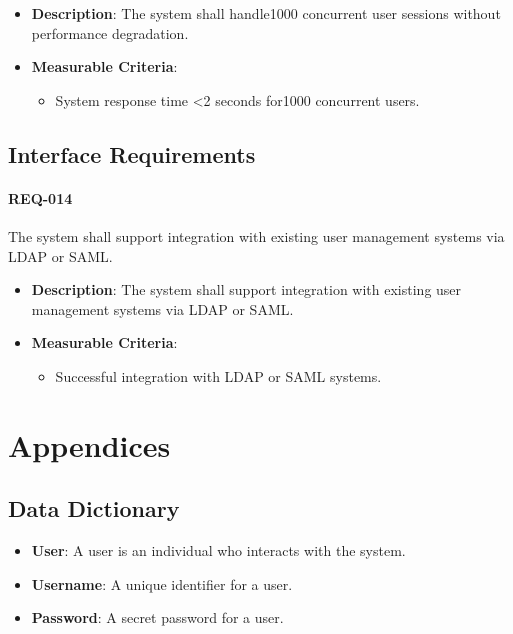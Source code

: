 \documentclass{article}
\begin{document}
\begin{itemize}
 \item \textbf{Description}: The system shall handle1000 concurrent user sessions without performance degradation.
 \item \textbf{Measurable Criteria}:
 \begin{itemize}
 \item System response time <2 seconds for1000 concurrent users.
 \end{itemize}
\end{itemize}

\subsection{Interface Requirements}

\paragraph{REQ-014}
The system shall support integration with existing user management systems via LDAP or SAML.

\begin{itemize}
 \item \textbf{Description}: The system shall support integration with existing user management systems via LDAP or SAML.
 \item \textbf{Measurable Criteria}:
 \begin{itemize}
 \item Successful integration with LDAP or SAML systems.
 \end{itemize}
\end{itemize}

\section{Appendices}
\label{sec:appendices}

\subsection{Data Dictionary}

\begin{itemize}
 \item \textbf{User}: A user is an individual who interacts with the system.
 \item \textbf{Username}: A unique identifier for a user.
 \item \textbf{Password}: A secret password for a user.
\end{itemize}
\end{document}
